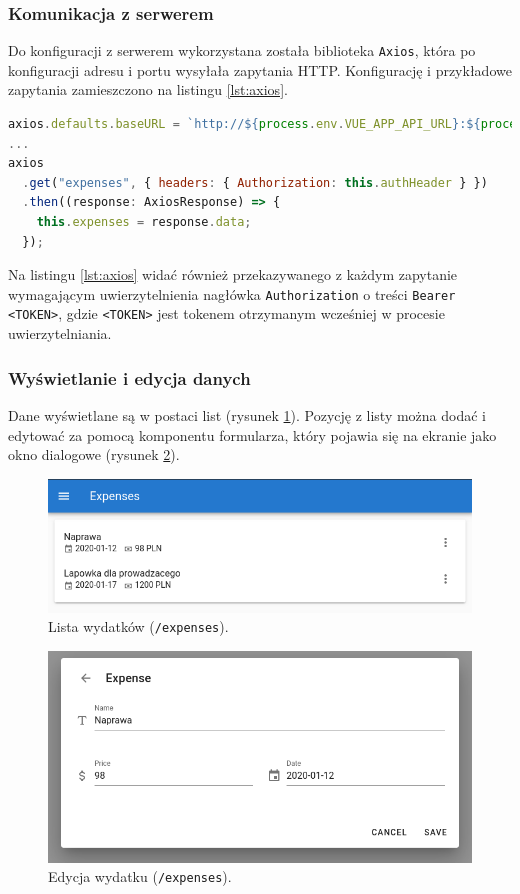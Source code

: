 \subsubsection{Komunikacja z serwerem}

Do konfiguracji z serwerem wykorzystana została biblioteka \lstinline{Axios}, która po konfiguracji adresu i portu wysyłała zapytania HTTP. Konfigurację i przykładowe zapytania zamieszczono na listingu \ref{lst:axios}.
\begin{lstlisting}[language=JavaScript, caption={Axios - konfiguracje i przykładowe użycie.}, label=lst:axios]
axios.defaults.baseURL = `http://${process.env.VUE_APP_API_URL}:${process.env.VUE_APP_API_PORT}`;
...
axios
  .get("expenses", { headers: { Authorization: this.authHeader } })
  .then((response: AxiosResponse) => {
    this.expenses = response.data;
  });
\end{lstlisting}

Na listingu \ref{lst:axios} widać również przekazywanego z każdym zapytanie wymagającym uwierzytelnienia nagłówka \lstinline{Authorization} o treści \lstinline{Bearer <TOKEN>}, gdzie \lstinline{<TOKEN>} jest tokenem otrzymanym wcześniej w procesie uwierzytelniania.

\subsubsection{Wyświetlanie i edycja danych}

Dane wyświetlane są w postaci list (rysunek \ref{ss:list}). Pozycję z listy można dodać i edytować za pomocą komponentu formularza, który pojawia się na ekranie jako okno dialogowe (rysunek \ref{ss:dialog}).

\begin{figure}[H]
  \centering
  \includegraphics[width=0.8\linewidth]{screenshots/list}
  \caption{Lista wydatków (\lstinline{/expenses}).}
  \label{ss:list}
\end{figure}
\begin{figure}[H]
  \centering
  \includegraphics[width=0.8\linewidth]{screenshots/dialog}
  \caption{Edycja wydatku (\lstinline{/expenses}).}
  \label{ss:dialog}
\end{figure}

